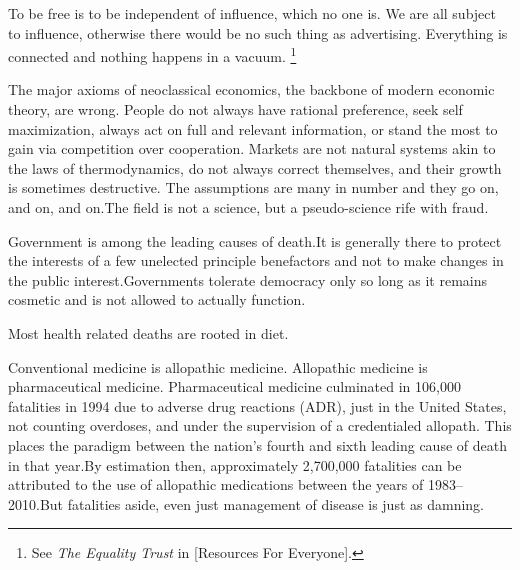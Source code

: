 
To be free is to be independent of influence, which no one is. We are all subject to influence, otherwise there would be no such thing as advertising. Everything is connected and nothing happens in a vacuum. \footnote{See {\it The Equality Trust} in [Resources For Everyone].}


The major axioms of neoclassical economics, the backbone of modern economic theory, are wrong. People do not always have rational preference, seek self maximization, always act on full and relevant information, or stand the most to gain via competition over cooperation. Markets are not natural systems akin to the laws of thermodynamics, do not always correct themselves, and their growth is sometimes destructive. The assumptions are many in number and they go on, and on, and on.\footnotecite[raj2010]\footnotecite[cobb1999] The field is not a science, but a pseudo-science rife with fraud.


Government is among the leading causes of death. It is generally there to protect the interests of a few unelected principle benefactors and not to make changes in the public interest. Governments tolerate democracy only so long as it remains cosmetic and is not allowed to actually function.


Most health related deaths are rooted in diet.


Conventional medicine is allopathic medicine. Allopathic medicine is pharmaceutical medicine. Pharmaceutical medicine culminated in 106,000 fatalities in 1994 due to adverse drug reactions (ADR), just in the United States, not counting overdoses, and under the supervision of a credentialed allopath. This places the paradigm between the nation's fourth and sixth leading cause of death in that year. By estimation then, approximately 2,700,000 fatalities can be attributed to the use of allopathic medications between the years of 1983--2010. But fatalities aside, even just management of disease is just as damning.

